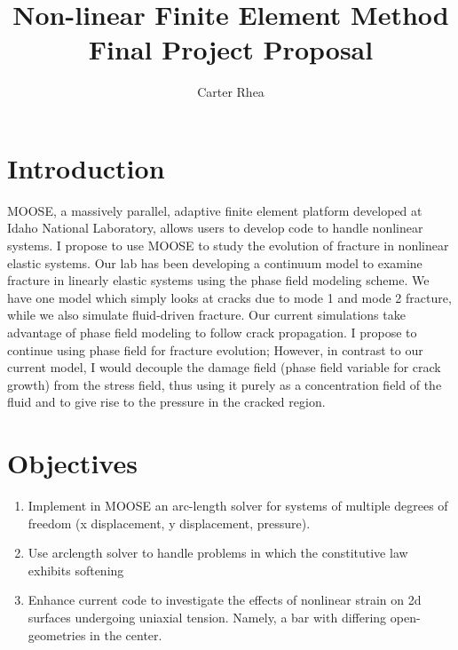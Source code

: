 \documentclass[12pt,a4paper]{article}
\author{Carter Rhea}
\title{Non-linear Finite Element Method Final Project Proposal}
\begin{document}
\maketitle

\section{Introduction}
MOOSE, a massively parallel, adaptive finite element platform developed at Idaho National Laboratory, allows users to develop code to handle nonlinear systems. I propose to use MOOSE to study the evolution of  fracture in nonlinear elastic systems. Our lab has been developing a continuum model to examine fracture in linearly elastic systems using the phase field modeling scheme. We have one model which simply looks at cracks due to mode 1 and mode 2 fracture, while we also simulate fluid-driven fracture. Our current simulations take advantage of phase field modeling to follow crack propagation. I propose to continue using phase field for fracture evolution; However, in contrast to our current model, I would decouple the damage field (phase field variable for crack growth) from the stress field, thus using it purely as a concentration field of the fluid and to give rise to the pressure in the cracked region. \\
\section{Objectives}
\begin{enumerate}
\item Implement in MOOSE an arc-length solver for systems of multiple degrees of freedom (x displacement, y displacement, pressure).
\item Use arclength solver to handle problems in which the constitutive law exhibits softening
\item Enhance current code to investigate the effects of nonlinear strain on 2d surfaces undergoing uniaxial tension. Namely, a bar with differing open-geometries in the center.

\end{enumerate}
\end{document}
